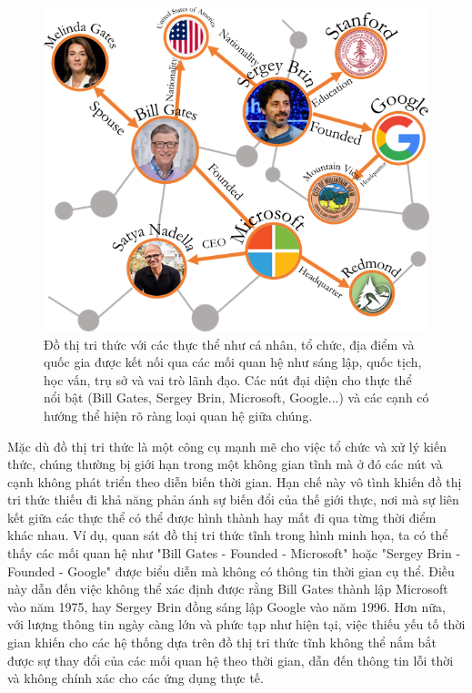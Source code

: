 \begin{figure}[htp]
\centering
\includegraphics[width=15cm]{images/KGexample1.png}
\caption{Đồ thị tri thức với các thực thể như cá nhân, tổ chức, địa điểm và quốc gia được kết nối qua các mối quan hệ như sáng lập, quốc tịch, học vấn, trụ sở và vai trò lãnh đạo.
Các nút đại diện cho thực thể nổi bật (Bill Gates, Sergey Brin, Microsoft, Google...) và các cạnh có hướng thể hiện rõ ràng loại quan hệ giữa chúng.}
\label{fig:chatbots_classification}
\end{figure}

Mặc dù đồ thị tri thức là một công cụ mạnh mẽ cho việc tổ chức và xử lý kiến thức, chúng thường bị giới hạn trong một không gian tĩnh mà ở đó các nút và cạnh không phát triển theo diễn biến thời gian. Hạn chế này vô tình khiến đồ thị tri thức thiếu đi khả năng phản ánh sự biến đổi của thế giới thực, nơi mà sự liên kết giữa các thực thể có thể được hình thành hay mất đi qua từng thời điểm khác nhau. Ví dụ, quan sát đồ thị tri thức tĩnh trong hình minh họa, ta có thể thấy các mối quan hệ như "Bill Gates - Founded - Microsoft" hoặc "Sergey Brin - Founded - Google" được biểu diễn mà không có thông tin thời gian cụ thể. Điều này dẫn đến việc không thể xác định được rằng Bill Gates thành lập Microsoft vào năm 1975, hay Sergey Brin đồng sáng lập Google vào năm 1996. Hơn nữa, với lượng thông tin ngày càng lớn và phức tạp như hiện tại, việc thiếu yếu tố thời gian khiến cho các hệ thống dựa trên đồ thị tri thức tĩnh không thể nắm bắt được sự thay đổi của các mối quan hệ theo thời gian, dẫn đến thông tin lỗi thời và không chính xác cho các ứng dụng thực tế.

